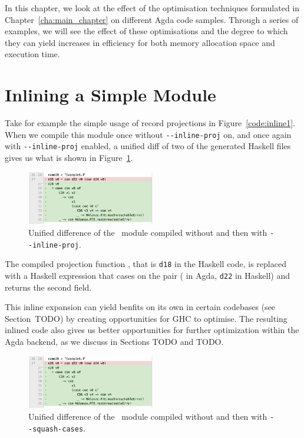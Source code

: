 In this chapter, we look at the effect of the optimisation techniques formulated in Chapter~\ref{cha:main_chapter} on different Agda code samples. Through a series of examples, we will see the effect of these optimisations and the degree to which they can yield increases in efficiency for both memory allocation space and execution time.

\section{Inlining a Simple Module}



Take for example the simple usage of record projections in Figure~\ref{code:inline1}. When we compile this module once without \texttt{-{}-inline-proj} on, and once again with \texttt{-{}-inline-proj} enabled, a unified diff of two of the generated Haskell files gives us what is shown in Figure~\ref{fig:Example1_inline}.

\begin{figure}
    \centering
    \includegraphics[width=0.5\textwidth]{Figures/Example1_inline}
    \caption{Unified difference of the ~module compiled without and then with \texttt{-{}-inline-proj}.}
    \label{fig:Example1_inline}
\end{figure}

The compiled projection function , that is \lstinline{d18} in the Haskell code, is replaced with a Haskell expression that cases on the pair ( in Agda, \lstinline{d22} in Haskell) and returns the second field.

This inline expansion can yield benfits on its own in certain codebases (see Section~TODO) by creating opportunities for GHC to optimise. The resulting inlined code also gives us better opportunities for further optimization within the Agda backend, as we discuss in Sections TODO and TODO.

\begin{figure}
    \centering
    \includegraphics[width=0.5\textwidth]{Figures/Example1_inline}
    \caption{Unified difference of the ~module compiled without and then with \texttt{-{}-squash-cases}.}
    \label{fig:Example1_squash}
\end{figure}

